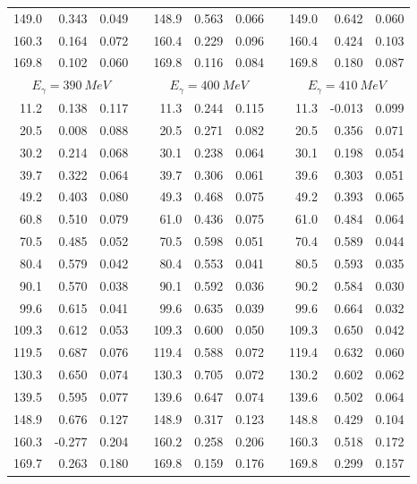 \begin{table}[htbp]
\begin{center}
\begin{tabular}{|r|r|c|l|r|r|c|l|r|r|c|}
149.0 & 0.343 & 0.049 & & 148.9 & 0.563 & 0.066 & & 149.0 & 0.642 & 0.060 \\ 
160.3 & 0.164 & 0.072 & & 160.4 & 0.229 & 0.096 & & 160.4 & 0.424 & 0.103 \\ 
169.8 & 0.102 & 0.060 & & 169.8 & 0.116 & 0.084 & & 169.8 & 0.180 & 0.087 \\ 
\hline 
\hline 
\multicolumn{3}{|c|}{ $E_{\gamma}=390~MeV$} & & 
\multicolumn{3}{c|}{ $E_{\gamma}=400~MeV$} & & 
\multicolumn{3}{c|}{ $E_{\gamma}=410~MeV$} \\ 
\cline{1-3} 
\cline{5-7} 
\cline{9-11} 
 11.2 & 0.138 & 0.117 & &  11.3 & 0.244 & 0.115 & &  11.3 & -0.013 & 0.099 \\ 
 20.5 & 0.008 & 0.088 & &  20.5 & 0.271 & 0.082 & &  20.5 & 0.356 & 0.071 \\ 
 30.2 & 0.214 & 0.068 & &  30.1 & 0.238 & 0.064 & &  30.1 & 0.198 & 0.054 \\ 
 39.7 & 0.322 & 0.064 & &  39.7 & 0.306 & 0.061 & &  39.6 & 0.303 & 0.051 \\ 
 49.2 & 0.403 & 0.080 & &  49.3 & 0.468 & 0.075 & &  49.2 & 0.393 & 0.065 \\ 
 60.8 & 0.510 & 0.079 & &  61.0 & 0.436 & 0.075 & &  61.0 & 0.484 & 0.064 \\ 
 70.5 & 0.485 & 0.052 & &  70.5 & 0.598 & 0.051 & &  70.4 & 0.589 & 0.044 \\ 
 80.4 & 0.579 & 0.042 & &  80.4 & 0.553 & 0.041 & &  80.5 & 0.593 & 0.035 \\ 
 90.1 & 0.570 & 0.038 & &  90.1 & 0.592 & 0.036 & &  90.2 & 0.584 & 0.030 \\ 
 99.6 & 0.615 & 0.041 & &  99.6 & 0.635 & 0.039 & &  99.6 & 0.664 & 0.032 \\ 
109.3 & 0.612 & 0.053 & & 109.3 & 0.600 & 0.050 & & 109.3 & 0.650 & 0.042 \\ 
119.5 & 0.687 & 0.076 & & 119.4 & 0.588 & 0.072 & & 119.4 & 0.632 & 0.060 \\ 
130.3 & 0.650 & 0.074 & & 130.3 & 0.705 & 0.072 & & 130.2 & 0.602 & 0.062 \\ 
139.5 & 0.595 & 0.077 & & 139.6 & 0.647 & 0.074 & & 139.6 & 0.502 & 0.064 \\ 
148.9 & 0.676 & 0.127 & & 148.9 & 0.317 & 0.123 & & 148.8 & 0.429 & 0.104 \\ 
160.3 & -0.277 & 0.204 & & 160.2 & 0.258 & 0.206 & & 160.3 & 0.518 & 0.172 \\ 
169.7 & 0.263 & 0.180 & & 169.8 & 0.159 & 0.176 & & 169.8 & 0.299 & 0.157 \\ 
\cline{1-3} 
\cline{5-7} 
\cline{9-11} 
\end{tabular} 

\end{center} 
\end{table} 
